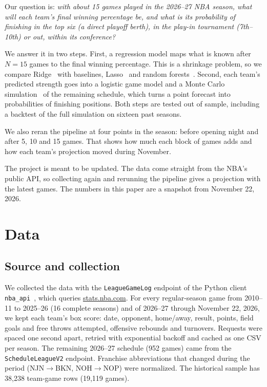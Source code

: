 \documentclass[conference]{IEEEtran}
\begin{document}
Our question is: \emph{with about 15 games played in the 2026--27 NBA season, what will each team's final winning percentage be, and what is its probability of finishing in the top six (a direct playoff berth), in the play-in tournament (7th--10th) or out, within its conference?}

We answer it in two steps. First, a regression model maps what is known after $N=15$ games to the final winning percentage. This is a shrinkage problem, so we compare Ridge~\cite{hoerl1970} with baselines, Lasso~\cite{tibshirani1996} and random forests~\cite{breiman2001}. Second, each team's predicted strength goes into a logistic game model and a Monte Carlo simulation~\cite{metropolis1949} of the remaining schedule, which turns a point forecast into probabilities of finishing positions. Both steps are tested out of sample, including a backtest of the full simulation on sixteen past seasons.

We also reran the pipeline at four points in the season: before opening night and after 5, 10 and 15 games. That shows how much each block of games adds and how each team's projection moved during November.

The project is meant to be updated. The data come straight from the NBA's public API, so collecting again and rerunning the pipeline gives a projection with the latest games. The numbers in this paper are a snapshot from November 22, 2026.

\section{Data}
\subsection{Source and collection}
We collected the data with the \texttt{LeagueGameLog} endpoint of the Python client \texttt{nba\_api}~\cite{nbaapi}, which queries \url{stats.nba.com}. For every regular-season game from 2010--11 to 2025--26 (16 complete seasons) and of 2026--27 through November 22, 2026, we kept each team's box score: date, opponent, home/away, result, points, field goals and free throws attempted, offensive rebounds and turnovers. Requests were spaced one second apart, retried with exponential backoff and cached as one CSV per season. The remaining 2026--27 schedule (952 games) came from the \texttt{ScheduleLeagueV2} endpoint. Franchise abbreviations that changed during the period (NJN$\to$BKN, NOH$\to$NOP) were normalized. The historical sample has 38,238 team-game rows (19,119 games).
\end{document}
